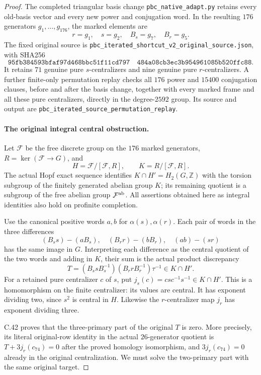 \begin{proof}
The completed triangular basis change
\texttt{pbc\_native\_adapt.py} retains every old-basis vector and
every new power and conjugation word. In the resulting $176$
generators $g_1,\ldots,g_{176}$, the marked elements are
\[
               r=g_1,\quad s=g_2,\quad
               B_s=g_7,\quad B_r=g_5.
 \tag{C.31.6}
\]
The fixed original source is
\texttt{pbc\_iterated\_shortcut\_v2\_original\_source.json},
with SHA256
\[
\texttt{95fb384593bfaf97d468bbc51f11cd797}
\quad\texttt{484a08cb3ec3b954961085b520ffc88}.
\]
It retains $71$ genuine pure $s$-centralizers and nine genuine pure
$r$-centralizers. A further finite-only permutation replay checks
all $176$ power and $15400$ conjugation clauses, before and after
the basis change, together with every marked frame and all these
pure centralizers, directly in the degree-$2592$ group. Its source
and output are \texttt{pbc\_iterated\_source\_permutation\_replay}.

\paragraph{The original integral central obstruction.}
Let $\mathcal F$ be the free discrete group on the $176$ marked
generators, $R=\ker(\mathcal F\to G)$, and
\[
              H=\mathcal F/[\mathcal F,R],\qquad
              K=R/[\mathcal F,R].
 \tag{C.31.7}
\]
The actual Hopf exact sequence identifies
$K\cap H'=H_2(G,\mathbb Z)$ with the torsion subgroup of the
finitely generated abelian group $K$; its remaining quotient is a
subgroup of the free abelian group $\mathcal F^{\rm ab}$.
All assertions obtained here as integral identities also hold on
profinite completion.

Use the canonical positive words $a,b$ for $\alpha(s),\alpha(r)$.
Each pair of words in the three differences
\[
       (B_s s)-(aB_s),\quad (B_r r)-(bB_r),\quad (ab)-(sr)
 \tag{C.31.8}
\]
has the same image in $G$. Interpreting each difference as the
central quotient of the two words and adding in $K$, their sum is
the actual product discrepancy
\[
             T=(B_s sB_s^{-1})(B_r rB_r^{-1})\tau^{-1}
                       \in K\cap H'.
 \tag{C.31.9}
\]
For a retained pure centralizer $c$ of $s$, put
$j_s(c)=csc^{-1}s^{-1}\in K\cap H'$. This is a homomorphism
on the finite centralizer: its values are central. It has exponent
dividing two, since $s^2$ is central in $H$. Likewise the
$r$-centralizer map $j_r$ has exponent dividing three.

C.42 proves that the three-primary part of the original $T$ is
zero. More precisely, its literal original-row identity in the
actual $26$-generator quotient is $T+3j_r(c_{74})=0$ after the
proved homology isomorphism, and $3j_r(c_{74})=0$ already in the
original centralization. We must solve the two-primary part with
the same original target.


\end{proof}
